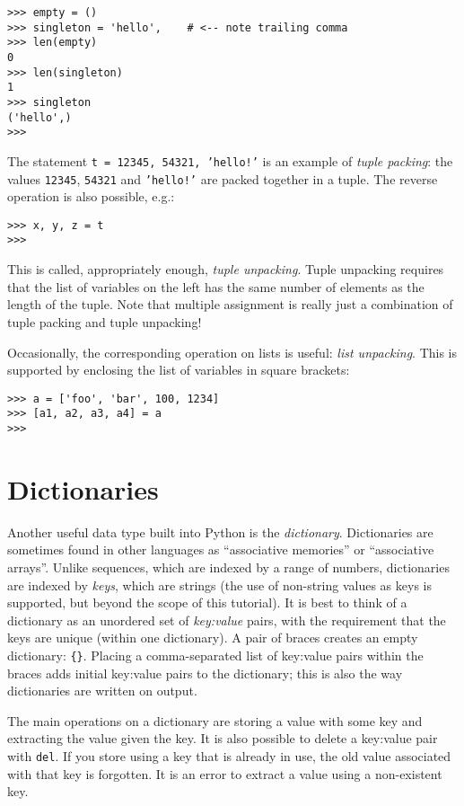 \bcode\begin{verbatim}
>>> empty = ()
>>> singleton = 'hello',    # <-- note trailing comma
>>> len(empty)
0
>>> len(singleton)
1
>>> singleton
('hello',)
>>>
\end{verbatim}\ecode
%
The statement {\tt t = 12345, 54321, 'hello!'} is an example of {\em
tuple packing}: the values {\tt 12345}, {\tt 54321} and {\tt 'hello!'}
are packed together in a tuple.  The reverse operation is also
possible, e.g.:

\bcode\begin{verbatim}
>>> x, y, z = t
>>>
\end{verbatim}\ecode
%
This is called, appropriately enough, {\em tuple unpacking}.  Tuple
unpacking requires that the list of variables on the left has the same
number of elements as the length of the tuple.  Note that multiple
assignment is really just a combination of tuple packing and tuple
unpacking!

Occasionally, the corresponding operation on lists is useful: {\em list
unpacking}.  This is supported by enclosing the list of variables in
square brackets:

\bcode\begin{verbatim}
>>> a = ['foo', 'bar', 100, 1234]
>>> [a1, a2, a3, a4] = a
>>>
\end{verbatim}\ecode

\section{Dictionaries}

Another useful data type built into Python is the {\em dictionary}.
Dictionaries are sometimes found in other languages as ``associative
memories'' or ``associative arrays''.  Unlike sequences, which are
indexed by a range of numbers, dictionaries are indexed by {\em keys},
which are strings (the use of non-string values as keys
is supported, but beyond the scope of this tutorial).
It is best to think of a dictionary as an unordered set of
{\em key:value} pairs, with the requirement that the keys are unique
(within one dictionary).
A pair of braces creates an empty dictionary: \verb/{}/.
Placing a comma-separated list of key:value pairs within the
braces adds initial key:value pairs to the dictionary; this is also the
way dictionaries are written on output.

The main operations on a dictionary are storing a value with some key
and extracting the value given the key.  It is also possible to delete
a key:value pair
with {\tt del}.
If you store using a key that is already in use, the old value
associated with that key is forgotten.  It is an error to extract a
value using a non-existent key.

